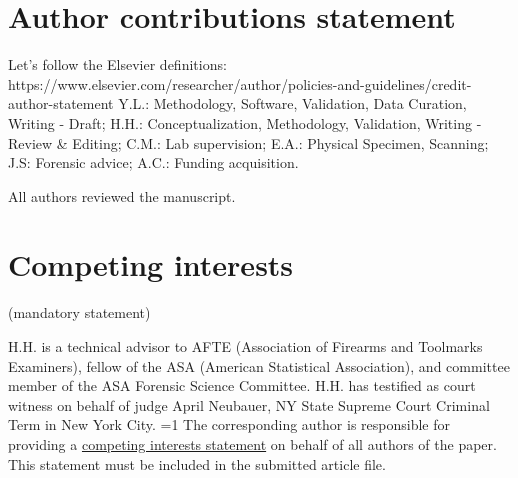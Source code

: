 \documentclass[fleqn,10pt]{wlscirep}
\newcommand{\ifinstruction}{0} %
\begin{document}
\section*{Author contributions statement}

Let's follow the Elsevier definitions:
https://www.elsevier.com/researcher/author/policies-and-guidelines/credit-author-statement
Y.L.: Methodology, Software, Validation, Data Curation, Writing - Draft;
H.H.: Conceptualization, Methodology, Validation, Writing - Review \&
Editing; C.M.: Lab supervision; E.A.: Physical Specimen, Scanning; J.S:
Forensic advice; A.C.: Funding acquisition.

\noindent
All authors reviewed the manuscript. 

\section*{Competing interests} (mandatory statement)

H.H. is a technical advisor to AFTE (Association of Firearms and
Toolmarks Examiners), fellow of the ASA (American Statistical
Association), and committee member of the ASA Forensic Science
Committee. H.H. has testified as court witness on behalf of judge April
Neubauer, NY State Supreme Court Criminal Term in New York City.
\ifnum \ifinstruction=1 The corresponding author is responsible for
providing a
\href{https://www.nature.com/sdata/policies/editorial-and-publishing-policies#competing}{competing interests statement}
on behalf of all authors of the paper. This statement must be included
in the submitted article file. \fi
\end{document}
